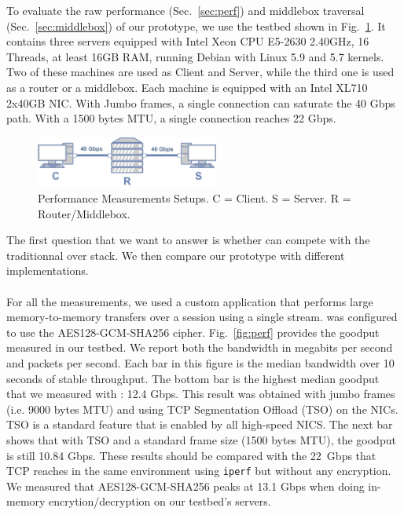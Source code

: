 To evaluate the raw performance (Sec.~\ref{sec:perf}) and middlebox traversal
(Sec.~\ref{sec:middlebox}) of our \tcpls prototype, we use the testbed shown in Fig.~\ref{fig:perf_testbed}. It contains three servers equipped with Intel Xeon CPU E5-2630 2.40GHz, 16 Threads, at least 16GB RAM, running Debian with Linux 5.9 and 5.7 kernels. Two of these machines are used as Client and Server,
while the third one is used as a router or a middlebox. Each machine is equipped with an Intel XL710 2x40GB NIC. With Jumbo frames, a single \tcp connection can saturate the 40 Gbps path. With a 1500 bytes MTU, a single connection reaches 22 Gbps.

\begin{figure}[!t]
  \begin{center}
    \includegraphics[width=6cm]{figures/testbed.png}
  \end{center}
  \vspace{-0.5cm}
  \caption{Performance Measurements Setups. C = Client. S = Server. R = Router/Middlebox.}
  \label{fig:perf_testbed}
\end{figure}


The first question that we want to answer is whether \tcpls can compete with the traditionnal \tls over \tcp stack. We then compare our \tcpls prototype with different \quic implementations.


\paragraph*{\tcpls}
For all the \tcpls measurements, we used a custom application that performs
large memory-to-memory transfers over a \tcpls session using a single stream.
\tcpls was configured to use the AES128-GCM-SHA256 cipher.
Fig.~\ref{fig:perf} provides the goodput measured in our
testbed. We report both the bandwidth in megabits per second and packets per
second.  Each bar in this figure is the median bandwidth over 10 seconds of stable
throughput. The bottom bar is the highest median goodput that we measured with \tcpls:
12.4 Gbps. This result was obtained with jumbo frames (i.e. 9000 bytes MTU)
and using TCP Segmentation Offload (TSO) on the NICs. TSO is a standard feature
that is enabled by all high-speed NICS. The next bar shows that with TSO and a
standard frame size (1500 bytes MTU), the goodput is still 10.84 Gbps. These
results should be compared with the 22~Gbps that TCP reaches in the same
environment using \texttt{iperf} but without any encryption. We measured that
AES128-GCM-SHA256 peaks at 13.1 Gbps when doing in-memory encrytion/decryption on our
testbed's servers.

